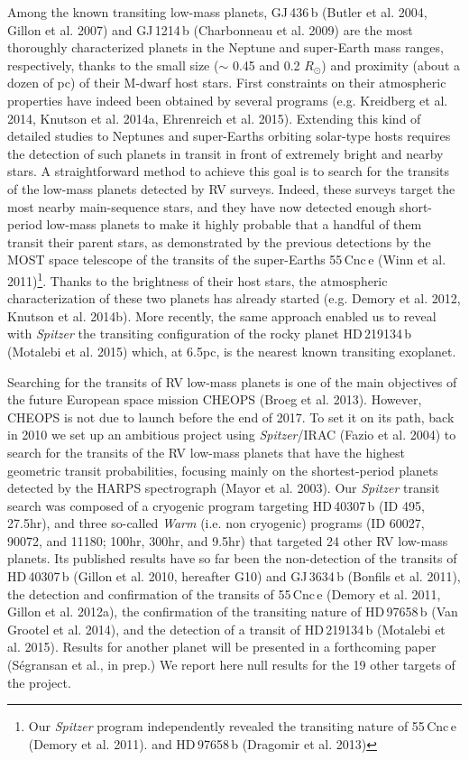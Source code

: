 \documentclass[traditabstract]{aa}
\begin{document}
Among the known transiting low-mass planets, GJ\,436\,b (Butler et al. 2004, Gillon et al. 2007) 
and GJ\,1214\,b (Charbonneau et al. 2009) are the most thoroughly characterized planets in
the Neptune and super-Earth mass ranges, respectively, thanks to the small size ($\sim$ 0.45 and
 0.2 $R_\odot$) and proximity (about a dozen of pc) of their M-dwarf host stars. First constraints on their 
 atmospheric properties have indeed been obtained by several programs (e.g. Kreidberg et al. 2014, Knutson 
et al. 2014a, Ehrenreich et al. 2015). Extending this kind of detailed studies to Neptunes and 
super-Earths orbiting solar-type hosts requires the detection of such planets in transit in front of extremely bright
and nearby stars. A straightforward method to achieve this goal is to search for the 
 transits of the low-mass planets detected by RV surveys. Indeed, these surveys target  the most 
 nearby  main-sequence stars, and they have now  detected enough short-period low-mass planets  
 to make it highly probable that a handful of them transit their parent stars, as demonstrated by the  
previous detections by the MOST space telescope of the transits of the super-Earths 55\,Cnc\,e (Winn et al. 2011)\footnote{
Our {\it Spitzer} program independently revealed the transiting nature of 55\,Cnc\,e (Demory et al. 2011).
and  HD\,97658\,b  (Dragomir  et al. 2013)}. 
Thanks to the brightness of their host stars, the  atmospheric 
  characterization of these two planets has already started (e.g. Demory et al. 2012,  Knutson et al. 2014b).
  More recently, the same approach enabled us to reveal with  {\it Spitzer} the transiting configuration of the rocky planet
   HD\,219134\,b (Motalebi et al. 2015) which, at 6.5pc, is  the nearest known transiting exoplanet.
    
 Searching for the transits of RV low-mass planets is one of the main objectives of  the future European 
 space mission CHEOPS (Broeg et al. 2013). However, CHEOPS is not due  to launch before the end of 2017. 
 To set it on its path,  back in 2010 we set up an ambitious project using  {\it Spitzer}/IRAC (Fazio et al. 2004) 
 to search for the transits of the RV low-mass planets that have the highest geometric transit probabilities, 
 focusing mainly on the shortest-period planets detected by the HARPS spectrograph (Mayor et al. 2003). Our 
 {\it Spitzer} transit search was composed of a cryogenic program targeting HD\,40307\,b (ID 495, 27.5hr), and  
  three so-called {\it Warm} (i.e. non cryogenic)  programs (ID 60027, 90072, and 11180; 100hr, 300hr, and 9.5hr) that targeted 
 24 other RV low-mass planets. Its published results  have so far been the non-detection of the transits of 
 HD\,40307\,b (Gillon et al. 2010, hereafter G10) and GJ\,3634\,b (Bonfils et al. 2011), the detection and 
 confirmation of the transits of 55\,Cnc\,e (Demory et al. 2011, Gillon et al. 2012a), the confirmation of 
 the transiting nature of HD\,97658\,b (Van Grootel et al. 2014), and the detection of a transit of 
 HD\,219134\,b (Motalebi et al. 2015). Results for another planet will be presented in a forthcoming
 paper (S\'egransan et al., in prep.) We report here null results for the 19 other targets of the project. 
 
\end{document}
